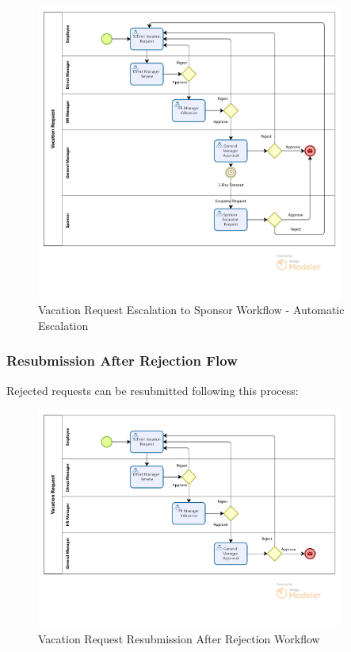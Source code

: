 \documentclass[12pt,a4paper]{article}
\begin{document}
\begin{figure}[H]
\centering
\includegraphics[width=0.9\textwidth]{Diagrams/Workflows/Vacation-Request-Escalation-to-Sponsor/Vacation-Request-Escalation-to-Sponsor.png}
\caption{Vacation Request Escalation to Sponsor Workflow - Automatic Escalation}
\label{fig:escalation-flow}
\end{figure}

\subsubsection{Resubmission After Rejection Flow}
Rejected requests can be resubmitted following this process:

\begin{figure}[H]
\centering
\includegraphics[width=0.9\textwidth]{Diagrams/Workflows/Vacation-Request-Resubmission-After-Rejection/Vacation-Request-Resubmission-After-Rejection.png}
\caption{Vacation Request Resubmission After Rejection Workflow}
\label{fig:resubmission-flow}
\end{figure}
\end{document}
